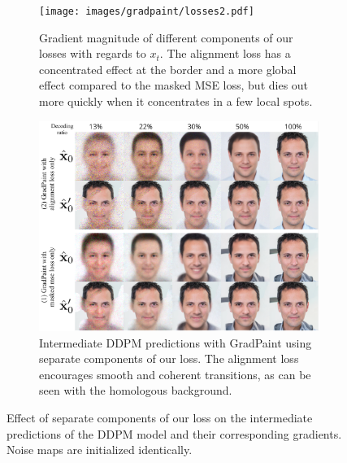 \begin{figure}[htbp]
  \begin{subfigure}[b]{0.50\linewidth}
    \texttt{[image: images/gradpaint/losses2.pdf]}
    \caption{Gradient magnitude of different components of our losses with regards to $x_t$. The alignment loss has a concentrated effect at the border and a more global effect compared to the masked MSE loss, but dies out more quickly when it concentrates in a few local spots.}
    \label{fig:loss_intuition-grad}
  \end{subfigure}
  \hfill %
  \hspace{0.3cm}
  \begin{subfigure}[b]{0.45\linewidth}
  \centering
    \includegraphics[width=0.8\linewidth]{images/gradpaint/losses1.pdf}
    \caption{Intermediate DDPM predictions with GradPaint using separate components of our loss. The alignment loss encourages smooth and coherent transitions, as can be seen with the homologous background.}
    \label{fig:loss_intuition-int}
  \end{subfigure}
  \caption{Effect of separate components of our loss on the intermediate predictions of the DDPM model and their corresponding gradients. Noise maps are initialized identically.}
  \label{fig:loss_intuition}
\end{figure}








\documentclass[main_for_review.tex]{subfiles}




\section{Experimental Results}

